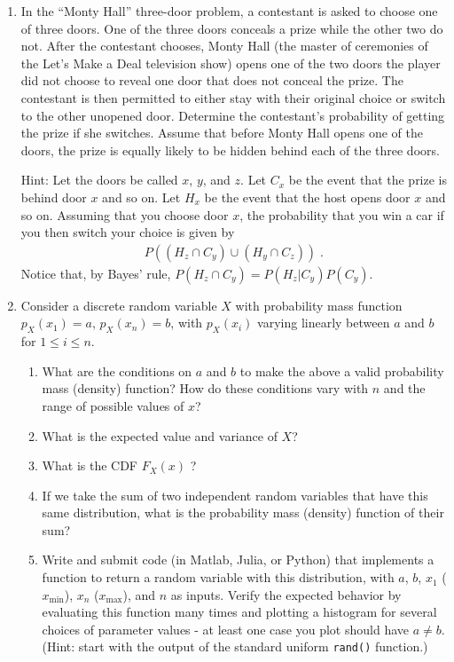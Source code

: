 \documentclass[letterpaper,12pt]{article}
\begin{document}
\begin{enumerate}
\item
In the ``Monty Hall'' three-door problem, a contestant is asked to choose one of three doors. One of the three doors conceals a prize while the other two do not. After the contestant chooses, Monty Hall (the master of ceremonies of the Let's Make a Deal television show) opens one of the two doors the player did not choose to reveal one door that does not conceal the prize. The contestant is then permitted to either stay with their original choice or switch to the other unopened door. Determine the contestant's probability of getting the prize if she switches. Assume that before Monty Hall opens one of the doors, the prize is equally likely to be hidden behind each of the three doors.

Hint: Let the doors be called $x$, $y$, and $z$. Let $C_x$ be the event that the prize is behind door $x$ and so on. Let $H_x$ be the event that the host opens door $x$ and so on. Assuming that you choose door $x$, the probability that you win a car if you then switch your choice is given by
\begin{align*}
    P((H_z \cap C_y) \cup (H_y \cap C_z)) \; .
\end{align*}
Notice that, by Bayes' rule, $P(H_z \cap C_y) = P(H_z|C_y) P(C_y)$.




\item
Consider a discrete random variable $X$ with probability mass function $p_X(x_1) = a$, $p_X(x_n) = b$, with $p_X(x_i)$ varying linearly between $a$ and $b$ for $1 \leq i \leq n$.

\begin{enumerate}
\item What are the conditions on $a$ and $b$ to make the above a valid probability mass (density) function? How do these conditions vary with $n$ and the range of possible values of $x$?
\item What is the expected value and variance of $X$?
\item What is the CDF $F_X(x)$ ?
\item If we take the sum of two independent random variables that have this same distribution, what is the probability mass (density) function of their sum?
\item Write and submit code (in Matlab, Julia, or Python) that implements a function to return a random variable with this distribution, with $a$, $b$, $x_1$ ($x_{\min}$), $x_n$ ($x_{\max}$), and $n$ as inputs. Verify the expected behavior by evaluating this function many times and plotting a histogram for several choices of parameter values - at least one case you plot should have $a \neq b$. (Hint: start with the output of the standard uniform \texttt{rand()} function.)
\end{enumerate}


\end{enumerate}
\end{document}
